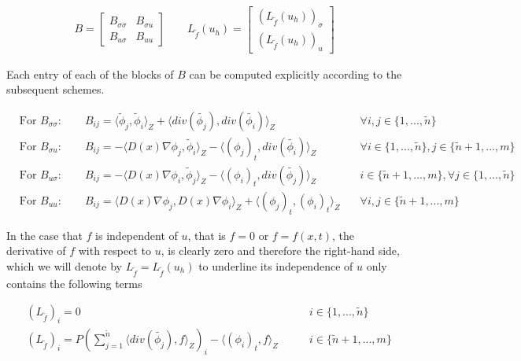 \documentclass[../draft_1.tex]{subfiles}
\begin{document}
\begin{ceqn}
	\begin{align}
B = \begin{bmatrix}
B_{\sigma \sigma} & B_{\sigma u} \\
B_{u \sigma}  & B_{uu} 
\end{bmatrix}
\qquad
 L_{\tilde{f}}(u_h) = \begin{bmatrix}
(L_{\tilde{f}}(u_h))_{\sigma} \\
(L_{\tilde{f}}(u_h))_u
 \end{bmatrix}
	\end{align}
\end{ceqn}
Each entry of each of the blocks of $B$ can be computed explicitly according to the subsequent schemes.
\begin{ceqn}
	\begin{align}
&\text{For } B_{\sigma \sigma} :	\qquad B_{ij} = \langle \tilde{\phi}_j, \tilde{\phi}_i \rangle_Z + \langle div(\tilde{\phi_j}), div(\tilde{\phi_i}) \rangle_Z \quad &\forall i,j \in \{1, ..., \tilde{n}\} \\
&\text{For } B_{\sigma u} : \qquad B_{ij} = - \langle D(x) \nabla \phi_j, \tilde{\phi}_i \rangle_Z - \langle (\phi_j)_t, div(\tilde{\phi_i}) \rangle_Z \quad &\forall i \in \{1, ..., \tilde{n}\}, j \in \{\tilde{n}+1, ..., m\} \\
&\text{For } B_{u \sigma} : \qquad B_{ij} = - \langle D(x) \nabla \phi_i, \tilde{\phi}_j \rangle_Z - \langle (\phi_i)_t, div(\tilde{\phi_j}) \rangle_Z \quad &i \in \{\tilde{n}+1, ..., m\}, \forall j \in \{1, ..., \tilde{n}\}\\
&\text{For } B_{uu} : \qquad B_{ij} = \langle D(x) \nabla \phi_j, D(x) \nabla \phi_i \rangle_Z + \langle (\phi_j)_t, (\phi_i)_t \rangle_Z \quad &\forall i,j \in \{\tilde{n}+1, ..., m\}
\end{align}
\end{ceqn}
In the case that $f$ is independent of $u$, that is $f = 0$ or $f = f(x,t)$, the derivative of $f$ with respect to $u$, is clearly zero and therefore the right-hand side, which we will denote by $L_{\tilde{f}} = L_{\tilde{f}}(u_h)$ to underline its independence of $u$ only contains the following terms
\begin{ceqn}
	\begin{align}
&(L_{\tilde{f}})_i = 0 \qquad &i \in \{1, ..., \tilde{n} \} \\
&(L_{\tilde{f}})_i = P(\sum_{j=1}^{\tilde{n}}\langle div(\tilde{\phi_j}), f \rangle_Z)_i - \langle (\phi_i)_t, f \rangle_Z \qquad  &i \in \{\tilde{n}+1, ..., m\}
\end{align}
\end{ceqn}
\end{document}
